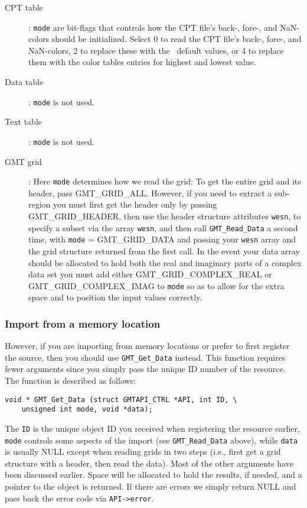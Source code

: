 \documentclass[11pt]{report}
\begin{document}
\begin{description}
\item [CPT table]:  \texttt{mode} are bit-flags that controls how the CPT file's back-, fore-, and NaN-colors
should be initialized.  Select 0 to read the CPT file's back-, fore-, and NaN-colors, 2
to replace these with the \GMT\ default values, or 4 to replace them with the color tables
entries for highest and lowest value.
\item [Data table]:  \texttt{mode} is not used.
\item [Text table]:  \texttt{mode} is not used.
\item [GMT grid]:  Here \texttt{mode} determines how we read the grid:
To get the entire grid and its header, pass GMT\_GRID\_ALL.  However, if you
need to extract a sub-region you must first get the header only by passing
GMT\_GRID\_HEADER, then use the header structure attributes \texttt{wesn},
to specify a subset via the array \texttt{wesn}, and then call
\texttt{GMT\_Read\_Data} a second time, with \texttt{mode} = GMT\_GRID\_DATA and passing your \texttt{wesn} array
and the grid structure returned from the first call.
In the event your data array should be allocated to hold both the real and imaginary parts of a
complex data set you must add either GMT\_GRID\_COMPLEX\_REAL or GMT\_GRID\_COMPLEX\_IMAG to \texttt{mode}
so as to allow for the extra space and to position the input values correctly.
\end{description}

\subsubsection{Import from a memory location}

However, if you are importing from memory locations or prefer to first register the source, then you
should use \texttt{GMT\_Get\_Data} instead.  This function requires fewer arguments since you simply
pass the unique ID number of the resource.  The function is described as follows:


\begin{verbatim}
void * GMT_Get_Data (struct GMTAPI_CTRL *API, int ID, \
    unsigned int mode, void *data);
\end{verbatim}
The \texttt{ID} is the unique object ID you received when registering the resource earlier,
\texttt{mode} controls some aspects of the import (see \texttt{GMT\_Read\_Data} above),
while \texttt{data} is usually NULL except when reading grids in two steps
(i.e., first get a grid structure with a header, then read the data).
Most of the other arguments have been discussed earlier.  
Space will be allocated to hold the results, if needed, and a pointer to the object is returned.
If there are errors we simply return NULL and pass back the error code via \texttt{API->error}.
\end{document}
